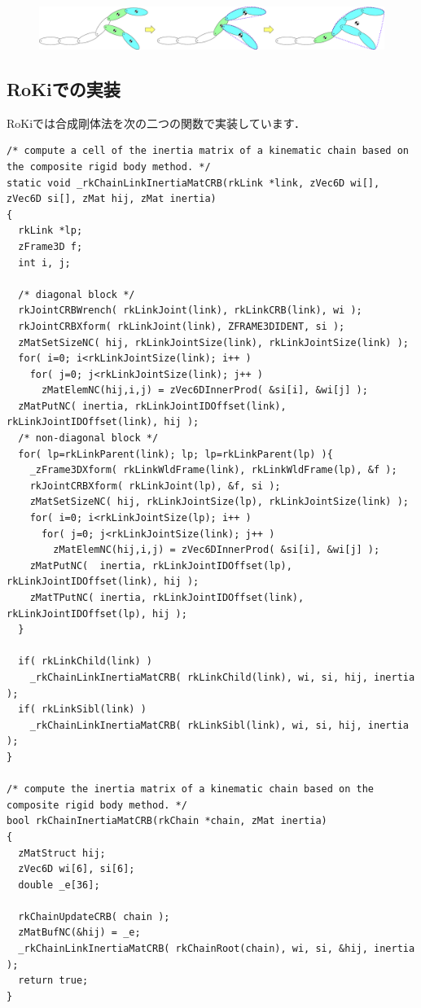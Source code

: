 \documentclass{jsarticle}
\begin{document}
\begin{figure}[h]
\begin{center}
\includegraphics[width=\textwidth]{crb_building_process.eps}
\end{center}
\end{figure}


\subsection{RoKiでの実装}

RoKiでは合成剛体法を次の二つの関数で実装しています．
\begin{verbatim}
/* compute a cell of the inertia matrix of a kinematic chain based on the composite rigid body method. */
static void _rkChainLinkInertiaMatCRB(rkLink *link, zVec6D wi[], zVec6D si[], zMat hij, zMat inertia)
{
  rkLink *lp;
  zFrame3D f;
  int i, j;

  /* diagonal block */
  rkJointCRBWrench( rkLinkJoint(link), rkLinkCRB(link), wi );
  rkJointCRBXform( rkLinkJoint(link), ZFRAME3DIDENT, si );
  zMatSetSizeNC( hij, rkLinkJointSize(link), rkLinkJointSize(link) );
  for( i=0; i<rkLinkJointSize(link); i++ )
    for( j=0; j<rkLinkJointSize(link); j++ )
      zMatElemNC(hij,i,j) = zVec6DInnerProd( &si[i], &wi[j] );
  zMatPutNC( inertia, rkLinkJointIDOffset(link), rkLinkJointIDOffset(link), hij );
  /* non-diagonal block */
  for( lp=rkLinkParent(link); lp; lp=rkLinkParent(lp) ){
    _zFrame3DXform( rkLinkWldFrame(link), rkLinkWldFrame(lp), &f );
    rkJointCRBXform( rkLinkJoint(lp), &f, si );
    zMatSetSizeNC( hij, rkLinkJointSize(lp), rkLinkJointSize(link) );
    for( i=0; i<rkLinkJointSize(lp); i++ )
      for( j=0; j<rkLinkJointSize(link); j++ )
        zMatElemNC(hij,i,j) = zVec6DInnerProd( &si[i], &wi[j] );
    zMatPutNC(  inertia, rkLinkJointIDOffset(lp), rkLinkJointIDOffset(link), hij );
    zMatTPutNC( inertia, rkLinkJointIDOffset(link), rkLinkJointIDOffset(lp), hij );
  }

  if( rkLinkChild(link) )
    _rkChainLinkInertiaMatCRB( rkLinkChild(link), wi, si, hij, inertia );
  if( rkLinkSibl(link) )
    _rkChainLinkInertiaMatCRB( rkLinkSibl(link), wi, si, hij, inertia );
}

/* compute the inertia matrix of a kinematic chain based on the composite rigid body method. */
bool rkChainInertiaMatCRB(rkChain *chain, zMat inertia)
{
  zMatStruct hij;
  zVec6D wi[6], si[6];
  double _e[36];

  rkChainUpdateCRB( chain );
  zMatBufNC(&hij) = _e;
  _rkChainLinkInertiaMatCRB( rkChainRoot(chain), wi, si, &hij, inertia );
  return true;
}
\end{verbatim}
\end{document}
